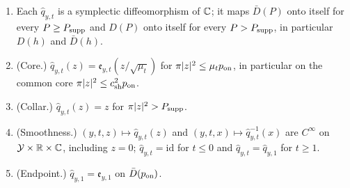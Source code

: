 \begin{lemma}
\begin{enumerate}[label=(\alph*)]
 $|w|\le\rho_c=c_{\rm sh}\sqrt{p_{\rm on}/\pi}$; $\hat J_{y,t}(w)=1/\mu_t$ for $\pi|w|^2>\mu_tP_{\rm supp}$; and
 $\mathcal A_{\hat J_{y,t}}(\mu_tP/\pi)=\operatorname{area}\phi_{y,t}(\bar D(P))$, which equals $\mu_tP$ for $P\le p_{\rm on}$ and $P$ for
 $P\ge P_{\rm supp}$. In particular $\mathcal A_{\hat J_{y,t}}(\infty)=\infty$.
\item Each $\hat q_{y,t}$ is a symplectic diffeomorphism of $\mathbb{C}$; it maps $\bar D(P)$ onto itself for every $P\ge P_{\rm supp}$ and
 $D(P)$ onto itself for every $P>P_{\rm supp}$, in particular $D(h)$ and $\bar D(h)$.
\item (Core.) $\hat q_{y,t}(z)=\mathfrak e_{y,t}(z/\sqrt{\mu_t})$ for $\pi|z|^2\le\mu_tp_{\rm on}$, in particular on the common core
 $\pi|z|^2\le c_{\rm sh}^2p_{\rm on}$.
\item (Collar.) $\hat q_{y,t}(z)=z$ for $\pi|z|^2>P_{\rm supp}$.
\item (Smoothness.) $(y,t,z)\mapsto\hat q_{y,t}(z)$ and $(y,t,x)\mapsto\hat q_{y,t}^{-1}(x)$ are $C^\infty$ on $\mathcal Y\times\mathbb{R}\times\mathbb{C}$,
 including $z=0$; $\hat q_{y,t}=\mathrm{id}$ for $t\le0$ and $\hat q_{y,t}=\hat q_{y,1}$ for $t\ge1$.
\item (Endpoint.) $\hat q_{y,1}=\mathfrak e_{y,1}$ on $\bar D(p_{\rm on})$.
\end{enumerate}
\end{lemma}


